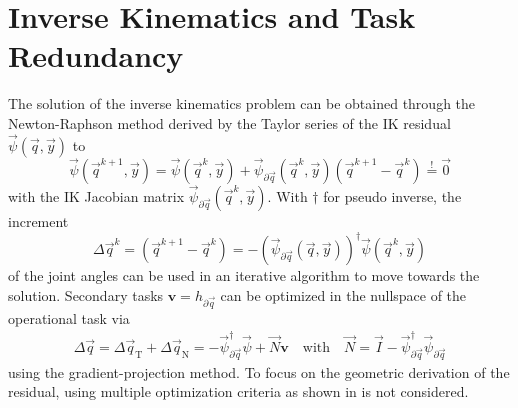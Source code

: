 \documentclass[graybox,vecphys]{svmult}
\newcommand{\bm}[1]{\boldsymbol{#1}}
\newcommand{\ResR}[0]{\vec{\psi}}
\begin{document}
\section{Inverse Kinematics and Task Redundancy}
\label{sec:inverse}

The solution of the inverse kinematics problem can be obtained through the Newton-Raphson method derived by the Taylor series of the IK residual $\ResR(\vec{q},\vec{y})$ to
\begin{equation}
\ResR(\vec{q}^{k+1},\vec{y}) =
\ResR(\vec{q}^{k},\vec{y})
+
\ResR_{\partial \vec{q}}(\vec{q}^k,\vec{y}) (\vec{q}^{k+1} - \vec{q}^k)
\overset{!}{=}
\vec{0}
\end{equation}
with the IK Jacobian matrix $\ResR_{\partial \vec{q}}(\vec{q}^k,\vec{y})$. 
With $\dagger$ for pseudo inverse, 
the increment
\begin{equation}
\Delta \vec{q}^k
=
(\vec{q}^{k+1} - \vec{q}^k)
=
- 
\left(\ResR_{\partial \vec{q}}(\vec{q},\vec{y})\right)^{\dagger}
\ResR(\vec{q}^{k},\vec{y})
\label{equ:deltaq_psi}
\end{equation}
of the joint angles can be used in an iterative algorithm to move towards the solution. 
Secondary tasks $\bm{v}{=}h_{\partial\vec{q}}$ can be optimized in the nullspace of the operational task via
\begin{align}
{\Delta}\vec{q}
=
{\Delta}\vec{q}_{\mathrm{T}} + {\Delta}\vec{q}_{\mathrm{N}}
=
-\ResR_{\partial\vec{q}}^{\dagger} \ResR +  \vec{N} \bm{v}
\quad \mathrm{with} \quad
\vec{N}=\vec{I}-\ResR_{\partial\vec{q}}^{\dagger}\ResR_{\partial\vec{q}}
\label{equ:nullspace}
\end{align}
using the gradient-projection method.
To focus on the geometric derivation of the residual, using multiple optimization criteria as shown in \cite{MoeAntTee2016} is not considered.
\end{document}
